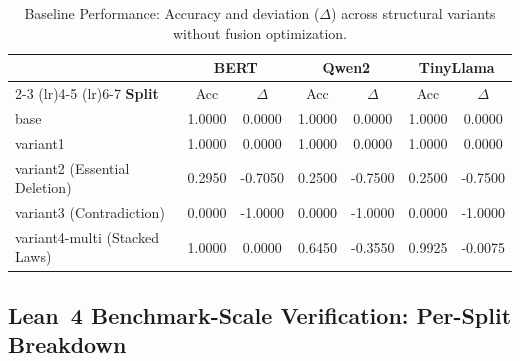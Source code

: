 \documentclass{article}
\begin{document}
\begin{table}[t]
\centering
\small
\begin{tabular}{lcccccc}
\toprule
& \multicolumn{2}{c}{\textbf{BERT}} &
  \multicolumn{2}{c}{\textbf{Qwen2}} &
  \multicolumn{2}{c}{\textbf{TinyLlama}} \\
\cmidrule(lr){2-3} \cmidrule(lr){4-5} \cmidrule(lr){6-7}
\textbf{Split} & Acc & $\Delta$ & Acc & $\Delta$ & Acc & $\Delta$ \\
\midrule
base                            & 1.0000 & 0.0000 & 1.0000 & 0.0000 & 1.0000 & 0.0000 \\
variant1                        & 1.0000 & 0.0000 & 1.0000 & 0.0000 & 1.0000 & 0.0000 \\
variant2 (Essential Deletion)   & 0.2950 & -0.7050 & 0.2500 & -0.7500 & 0.2500 & -0.7500 \\
variant3 (Contradiction)        & 0.0000 & -1.0000 & 0.0000 & -1.0000 & 0.0000 & -1.0000 \\
variant4-multi (Stacked Laws)   & 1.0000 & 0.0000 & 0.6450 & -0.3550 & 0.9925 & -0.0075 \\
\bottomrule
\end{tabular}
\caption{Baseline Performance: Accuracy and deviation ($\Delta$) across structural variants without fusion optimization.}
\label{tab:all_models_deltas}
\end{table}


\subsection{Lean~4 Benchmark-Scale Verification: Per-Split Breakdown}
\label{app:lean-bench-table}
\end{document}
